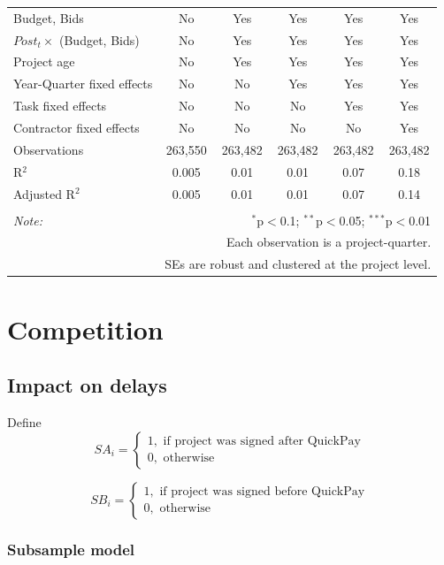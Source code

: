 \documentclass[
]{article}
\begin{document}
\begin{table}[H]
\begin{tabular}{@{\extracolsep{-2pt}}lccccc}
Budget, Bids & No & Yes & Yes & Yes & Yes \\ 
$Post_t \times $  (Budget, Bids) & No & Yes & Yes & Yes & Yes \\ 
Project age & No & Yes & Yes & Yes & Yes \\ 
Year-Quarter fixed effects & No & No & Yes & Yes & Yes \\ 
Task fixed effects & No & No & No & Yes & Yes \\ 
Contractor fixed effects & No & No & No & No & Yes \\ 
Observations & 263,550 & 263,482 & 263,482 & 263,482 & 263,482 \\ 
R$^{2}$ & 0.005 & 0.01 & 0.01 & 0.07 & 0.18 \\ 
Adjusted R$^{2}$ & 0.005 & 0.01 & 0.01 & 0.07 & 0.14 \\ 
\hline 
\hline \\[-1.8ex] 
\textit{Note:}  & \multicolumn{5}{r}{$^{*}$p$<$0.1; $^{**}$p$<$0.05; $^{***}$p$<$0.01} \\ 
 & \multicolumn{5}{r}{Each observation is a project-quarter.} \\ 
 & \multicolumn{5}{r}{SEs are robust and clustered at the project level.} \\ 
\end{tabular} 
\end{table}

\hypertarget{competition}{%
\section{Competition}\label{competition}}

\hypertarget{impact-on-delays}{%
\subsection{Impact on delays}\label{impact-on-delays}}

Define
\[ SA_i = \begin{cases} 1, \text{ if project was signed after QuickPay}\\
0, \text{ otherwise} \end{cases}\]

\[ SB_i = \begin{cases} 1, \text{ if project was signed before QuickPay}\\
0, \text{ otherwise} \end{cases}\]

\hypertarget{subsample-model}{%
\subsubsection{Subsample model}\label{subsample-model}}
\end{document}
